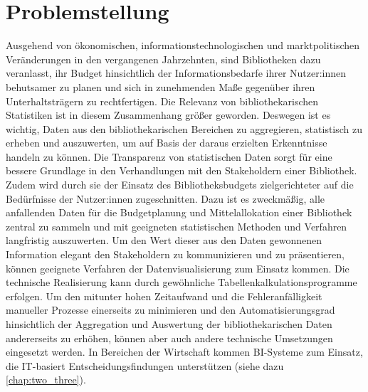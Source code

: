 \section{Problemstellung}
Ausgehend von ökonomischen, informationstechnologischen und marktpolitischen Veränderungen in den
vergangenen Jahrzehnten, sind Bibliotheken dazu veranlasst, ihr Budget hinsichtlich der Informationsbedarfe
ihrer Nutzer:innen behutsamer zu planen und sich in zunehmenden Maße gegenüber ihren Unterhaltsträgern zu rechtfertigen.
Die Relevanz von bibliothekarischen Statistiken ist in diesem Zusammenhang größer geworden.
Deswegen ist es wichtig, Daten aus den bibliothekarischen Bereichen zu aggregieren, statistisch zu erheben und 
auszuwerten, um auf Basis der daraus erzielten Erkenntnisse handeln zu können. 
Die Transparenz von statistischen Daten sorgt für eine bessere Grundlage in den Verhandlungen mit den Stakeholdern
einer Bibliothek. Zudem wird durch sie der Einsatz des Bibliotheksbudgets zielgerichteter auf die Bedürfnisse der Nutzer:innen zugeschnitten.
Dazu ist es zweckmäßig, alle anfallenden Daten für die Budgetplanung und Mittelallokation einer Bibliothek zentral zu sammeln und mit geeigneten 
statistischen Methoden und Verfahren langfristig auszuwerten. Um den Wert dieser aus den Daten gewonnenen Information elegant den Stakeholdern zu kommunizieren und zu präsentieren,
können geeignete Verfahren der Datenvisualisierung zum Einsatz kommen. Die technische Realisierung kann durch gewöhnliche Tabellenkalkulationsprogramme erfolgen.
Um den mitunter hohen Zeitaufwand und die Fehleranfälligkeit manueller Prozesse einerseits zu minimieren und den Automatisierungsgrad hinsichtlich der Aggregation und Auswertung der bibliothekarischen Daten 
andererseits zu erhöhen, können aber auch andere technische Umsetzungen eingesetzt werden. In Bereichen der Wirtschaft kommen \acrfull{BI}-Systeme zum Einsatz, 
die IT-basiert Entscheidungsfindungen unterstützen (siehe dazu \autoref{chap:two_three}).

